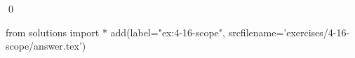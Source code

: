 
\begin{ex}
  \label{ex:4-16-scope}
  
  \qed
\end{ex}
\begin{python0}
from solutions import *
add(label="ex:4-16-scope",
    srcfilename='exercises/4-16-scope/answer.tex')
\end{python0}
